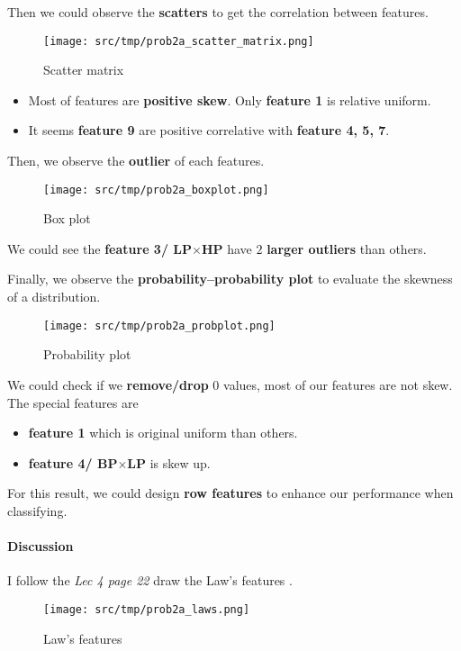 Then we could observe the \textbf{scatters}  to get the correlation between features.
\begin{figure}
    \centering
    \texttt{[image: src/tmp/prob2a\_scatter\_matrix.png]}
    \caption{Scatter matrix}
    \label{prob2a_scatter_matrix}
\end{figure}

\begin{itemize}
    \item Most of features are \textbf{positive skew}. Only \textbf{feature 1} is relative uniform.
    \item It seems \textbf{feature 9} are positive correlative with \textbf{feature 4, 5, 7}.
\end{itemize}

Then, we observe the \textbf{outlier}  of each features.
\begin{figure}
    \centering
    \texttt{[image: src/tmp/prob2a\_boxplot.png]}
    \caption{Box plot}
    \label{prob2a_boxplot}
\end{figure}
We could see the \textbf{feature 3/ LP\(\times\)HP} have \(2\) \textbf{larger outliers} than others.

Finally, we observe the \textbf{probability–probability plot}  to evaluate the skewness of a distribution.
\begin{figure}
    \centering
    \texttt{[image: src/tmp/prob2a\_probplot.png]}
    \caption{Probability plot}
    \label{prob2a_probplot}
\end{figure}
We could check if we \textbf{remove/drop} \(0\) values, most of our features are not skew. The special features are 
\begin{itemize}
    \item \textbf{feature 1} which is original uniform than others.
    \item \textbf{feature 4/ BP\(\times\)LP} is skew up.
\end{itemize}
For this result, we could design \textbf{row features} to enhance our performance when classifying.

\paragraph{Discussion}
I follow the \textit{Lec 4 page 22} draw the Law's features .
\begin{figure}
    \centering
    \texttt{[image: src/tmp/prob2a\_laws.png]}
    \caption{Law's features}
    \label{prob2a_laws}
\end{figure}

